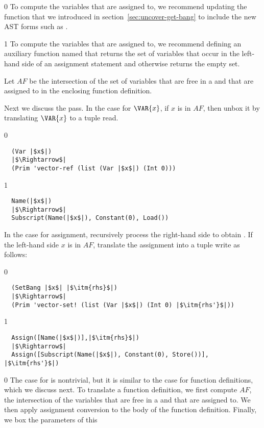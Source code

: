 \documentclass[7x10]{TimesAPriori_MIT}%
\def\racketEd{0}
\def\pythonEd{1}
\def\edition{1}
\newcommand{\pythonColor}[0]{}
\numberwithin{theorem}{chapter}
\numberwithin{definition}{chapter}
\numberwithin{equation}{chapter}
\begin{document}
{\if\edition\racketEd
%
To compute the variables that are assigned to, we recommend updating
the  function that we introduced in
section~\ref{sec:uncover-get-bang} to include the new AST forms such
as .
%
\fi}
  
{\if\edition\pythonEd\pythonColor
%
To compute the variables that are assigned to, we recommend defining
an auxiliary function named  that returns
the set of variables that occur in the left-hand side of an assignment
statement and otherwise returns the empty set.
%
\fi}

Let $\mathit{AF}$ be the intersection of the set of variables that are
free in a  and that are assigned to in the enclosing
function definition.

Next we discuss the  pass.  In the case for
$\VAR{x}$, if $x$ is in $\mathit{AF}$, then unbox it by translating
$\VAR{x}$ to a tuple read.
%
{\if\edition\racketEd
\begin{lstlisting}
  (Var |$x$|)
  |$\Rightarrow$|
  (Prim 'vector-ref (list (Var |$x$|) (Int 0)))
\end{lstlisting}
\fi}
%
{\if\edition\pythonEd\pythonColor
\begin{lstlisting}
  Name(|$x$|)
  |$\Rightarrow$|
  Subscript(Name(|$x$|), Constant(0), Load())
\end{lstlisting}
\fi}
%
\noindent In the case for assignment, recursively process the
right-hand side  to obtain .  If the left-hand side
$x$ is in $\mathit{AF}$, translate the assignment into a tuple write
as follows:
%
{\if\edition\racketEd
\begin{lstlisting}
  (SetBang |$x$| |$\itm{rhs}$|)
  |$\Rightarrow$|
  (Prim 'vector-set! (list (Var |$x$|) (Int 0) |$\itm{rhs'}$|))
\end{lstlisting}
\fi}
{\if\edition\pythonEd\pythonColor
\begin{lstlisting}
  Assign([Name(|$x$|)],|$\itm{rhs}$|)
  |$\Rightarrow$|
  Assign([Subscript(Name(|$x$|), Constant(0), Store())], |$\itm{rhs'}$|)
\end{lstlisting}
\fi}
%
{\if\edition\racketEd
The case for  is nontrivial, but it is similar to the
case for function definitions, which we discuss next.
\fi}
%
To translate a function definition, we first compute $\mathit{AF}$,
the intersection of the variables that are free in a  and
that are assigned to. We then apply assignment conversion to the body
of the function definition. Finally, we box the parameters of this
\end{document}
